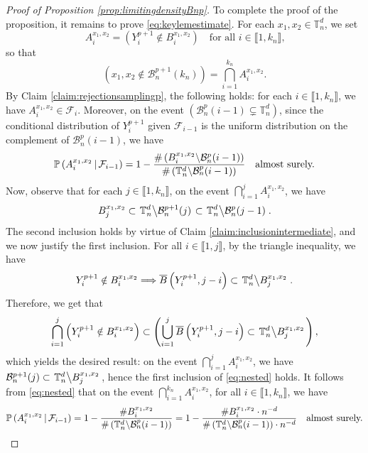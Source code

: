 \documentclass[a4paper,11pt]{article}
\begin{document}
\begin{proof}[Proof of Proposition \ref{prop:limitingdensityBnp}]
To complete the proof of the proposition, it remains to prove \eqref{eq:keylemestimate}.
For each $x_1,x_2\in\mathbb{T}_n^d$, we set
\[A_i^{x_1,x_2}=\left(Y_{i}^{p+1}\notin B_i^{x_1,x_2}\right)\quad\text{for all $i\in\llbracket1,k_n\rrbracket$,}\]
so that
\[\left(x_1,x_2\notin\mathcal{B}_n^{p+1}(k_n)\right)=\bigcap_{i=1}^{k_n}A_i^{x_1,x_2}.\]
By Claim \ref{claim:rejectionsamplingp}, the following holds: for each $i\in\llbracket1,k_n\rrbracket$, we have $A_i^{x_1,x_2}\in\mathcal{F}_i$.
Moreover, on the event $\left(\mathcal{B}_n^p(i-1)\varsubsetneq\mathbb{T}_n^d\right)$, since the conditional distribution of $Y_i^{p+1}$ given $\mathcal{F}_{i-1}$ is the uniform distribution on the complement of $\mathcal{B}_n^p(i-1)$, we have
\[\mathbb{P}\left(A_i^{x_1,x_2}\,\middle|\,\mathcal{F}_{i-1}\right)=1-\frac{\#\left(B_i^{x_1,x_2}\middle\backslash\mathcal{B}_n^p(i-1)\right)}{\#\left(\mathbb{T}_n^d\middle\backslash\mathcal{B}_n^p(i-1)\right)}\quad\text{almost surely.}\]
Now, observe that for each $j\in\llbracket1,k_n\rrbracket$, on the event $\bigcap_{i=1}^jA_i^{x_1,x_2}$, we have
\begin{equation}\label{eq:nested}
B_j^{x_1,x_2}\subset\left.\mathbb{T}_n^d\middle\backslash\mathcal{B}_n^{p+1}(j)\right.\subset\left.\mathbb{T}_n^d\middle\backslash\mathcal{B}_n^p(j-1)\right..
\end{equation}
The second inclusion holds by virtue of Claim \ref{claim:inclusionintermediate}, and we now justify the first inclusion.
For all $i\in\llbracket1,j\rrbracket$, by the triangle inequality, we have
\[Y_i^{p+1}\notin B_i^{x_1,x_2}\Longrightarrow\overline{B}\left(Y_i^{p+1},j-i\right)\subset\left.\mathbb{T}_n^d\middle\backslash B_j^{x_1,x_2}\right..\]
Therefore, we get that
\[\bigcap_{i=1}^j\left(Y_i^{p+1}\notin B_i^{x_1,x_2}\right)\subset\left(\bigcup_{i=1}^j\overline{B}\left(Y_i^{p+1},j-i\right)\subset\left.\mathbb{T}_n^d\middle\backslash B_j^{x_1,x_2}\right.\right),\]
which yields the desired result: on the event $\bigcap_{i=1}^jA_i^{x_1,x_2}$, we have $\mathcal{B}_n^{p+1}(j)\subset\left.\mathbb{T}_n^d\middle\backslash B_j^{x_1,x_2}\right.$, hence the first inclusion of \eqref{eq:nested} holds.
It follows from \eqref{eq:nested} that on the event $\bigcap_{i=1}^{k_n}A_i^{x_1,x_2}$, for all $i\in\llbracket1,k_n\rrbracket$, we have
\begin{equation}\label{eq:nested'}
\mathbb{P}\left(A_i^{x_1,x_2}\,\middle|\,\mathcal{F}_{i-1}\right)=1-\frac{\#B_i^{x_1,x_2}}{\#\left(\mathbb{T}_n^d\middle\backslash\mathcal{B}_n^p(i-1)\right)}=1-\frac{\#B_i^{x_1,x_2}\cdot n^{-d}}{\#\left(\mathbb{T}_n^d\middle\backslash\mathcal{B}_n^p(i-1)\right)\cdot n^{-d}}\quad\text{almost surely.}

\end{equation}
\end{proof}
\end{document}
